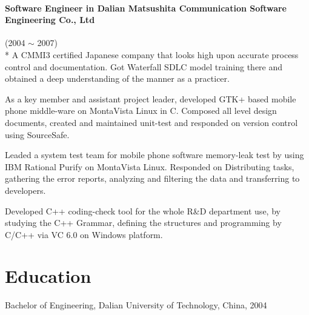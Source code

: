 \documentclass[a4paper,11pt]{article}
\begin{document}
\paragraph{Software Engineer in Dalian Matsushita Communication Software Engineering Co., Ltd} (2004 $\sim$ 2007) \\*
A CMMI3 certified Japanese company that looks high upon accurate process control and documentation. Got Waterfall SDLC model training there and obtained a deep understanding of the manner as a practicer. 
\begin{itemize*}
    \setlength\itemsep{0.4em}
  \item As a key member and assistant project leader, developed GTK+ based mobile phone middle-ware on MontaVista Linux in C. Composed all level design documents, created and maintained unit-test and responded on version control using SourceSafe.
  \item Leaded a system test team for mobile phone software memory-leak test by using IBM Rational Purify on MontaVista Linux. Responded on Distributing tasks, gathering the error reports, analyzing and filtering the data and transferring to developers.
  \item Developed C++ coding-check tool for the whole R\&D department use, by studying the C++ Grammar, defining the structures and programming by C/C++ via VC 6.0 on Windows platform.
\end{itemize*}

\section*{Education}
Bachelor of Engineering, Dalian University of Technology, China, 2004

\begin{comment}
\begin{tabular}{l l}
  Duration:   & 2000 - 2004 \\
  University: & Dalian University of Technology \\
  Degree:     & Bachelor of Engineering \\
  Major:      & Electronic and Information Engineering \\
  Minor:      & International Economics and Trade \\
  Country:    & China \\
\end{tabular}
\end{comment}
\end{document}
